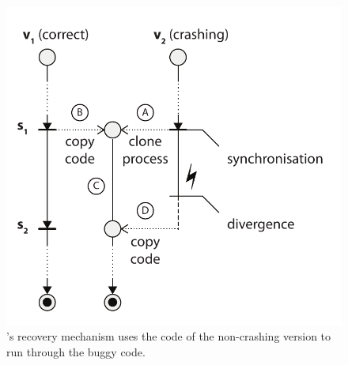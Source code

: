 

\begin{figure}[t]
\centering
\includegraphics[width=0.5\columnwidth]{safe-updates/figures/strategy}
\caption{\rem's recovery mechanism uses the code of the non-crashing
  version to run through the buggy code.}
\label{fig:solution3}
\end{figure}


